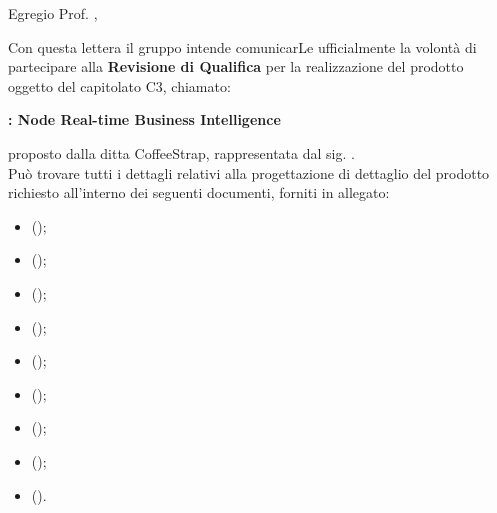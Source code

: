 \documentclass{letter}
\begin{document}
\begin{letter}{}

	\vspace{4cm}
	
	\opening{Egregio Prof. \committente{},}
	
	Con questa lettera il gruppo \groupname{} intende comunicarLe ufficialmente la volontà di partecipare alla \textbf{Revisione di Qualifica} per la realizzazione del prodotto oggetto del capitolato C3, chiamato:
	\begin{center}
		\textbf{\projectname{}: Node Real-time Business Intelligence}
	\end{center}
	proposto dalla ditta CoffeeStrap, rappresentata dal sig. \proponente{}.\\
	Può trovare tutti i dettagli relativi alla progettazione di dettaglio del prodotto richiesto all'interno dei seguenti documenti, forniti in allegato:

	\begin{itemize}
		\item {} ();
		\item {} ();
		\item {} ();
		\item {} ();
		\item {} ();
		\item {} ();
		\item {} ();
		\item {} ();
		\item {} ().
	\end{itemize}
	

\end{letter}
\end{document}
